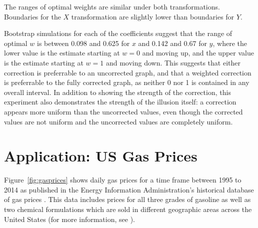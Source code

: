 \documentclass[11pt]{isuthesis}\usepackage[]{graphicx}\usepackage[]{color}
\begin{document}
The ranges of optimal weights are similar under both transformations. Boundaries for the $X$ transformation are slightly lower than boundaries for $Y$. 

Bootstrap simulations for each of the coefficients suggest that the range of optimal $w$ is between 0.098 and 0.625 for $x$ and 0.142 and 0.67 for $y$, where the lower value is the estimate starting at $w=0$ and moving up, and the upper value is the estimate starting at $w=1$ and moving down. This suggests that either correction is preferrable to an uncorrected graph, and that a weighted correction is preferrable to the fully corrected graph, as neither 0 nor 1 is contained in any overall interval. In addition to showing the strength of the correction, this experiment also demonstrates the strength of the illusion itself: a correction appears more uniform than the uncorrected values, even though the corrected values are not uniform and the uncorrected values are completely uniform. 

\section{Application: US Gas Prices}
Figure~\ref{fig:gasprices} shows daily gas prices for a time frame between 1995 to 2014 as published in the Energy Information Administration's historical database of gas prices \citep{EIA}. This data includes prices for all three grades of gasoline as well as two chemical formulations which are sold in different geographic areas across the United States (for more information, see \citep{EIA-reformulated}). 
\end{document}
